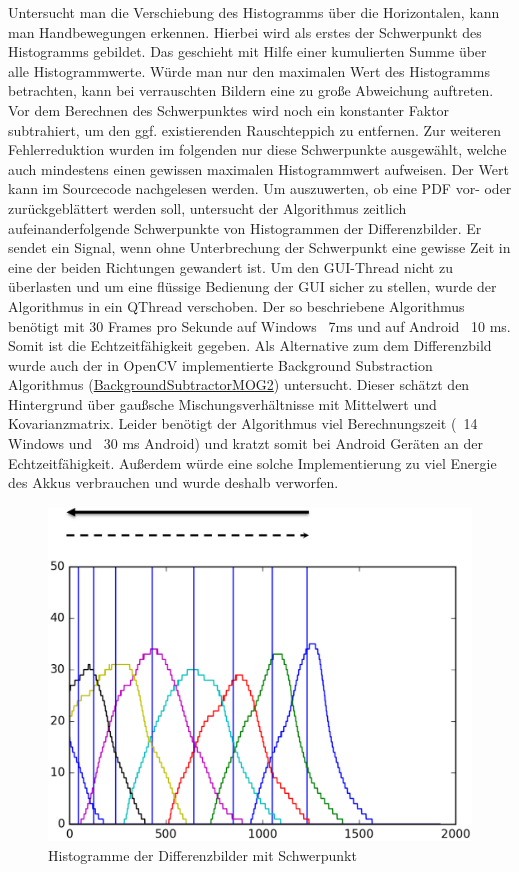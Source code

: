 Untersucht man die Verschiebung des Histogramms über die Horizontalen, kann man Handbewegungen erkennen. Hierbei wird als erstes der Schwerpunkt des Histogramms gebildet. Das geschieht mit Hilfe einer kumulierten Summe über alle Histogrammwerte. Würde man nur den maximalen Wert des Histogramms betrachten, kann bei verrauschten Bildern eine zu große Abweichung auftreten. Vor dem Berechnen des Schwerpunktes wird noch ein konstanter Faktor subtrahiert, um den ggf. existierenden Rauschteppich zu entfernen. Zur weiteren Fehlerreduktion wurden im folgenden nur diese Schwerpunkte ausgewählt, welche auch mindestens einen gewissen maximalen Histogrammwert aufweisen. Der Wert kann im Sourcecode nachgelesen werden. Um auszuwerten, ob eine PDF vor- oder zurückgeblättert werden soll, untersucht der Algorithmus zeitlich aufeinanderfolgende Schwerpunkte von Histogrammen der Differenzbilder. Er sendet ein Signal, wenn ohne Unterbrechung der Schwerpunkt eine gewisse Zeit in eine der beiden Richtungen gewandert ist. Um den GUI-Thread nicht zu überlasten und um eine flüssige Bedienung der GUI sicher zu stellen, wurde der Algorithmus in ein QThread verschoben. Der so beschriebene Algorithmus benötigt mit 30 Frames pro Sekunde auf Windows ~7ms und auf Android ~10 ms. Somit ist die Echtzeitfähigkeit gegeben. Als Alternative zum dem Differenzbild wurde auch der in OpenCV implementierte Background Substraction Algorithmus (\href{http://docs.opencv.org/3.0-rc1/d7/d7b/classcv_1_1BackgroundSubtractorMOG2.html}{BackgroundSubtractorMOG2}) untersucht. Dieser schätzt den Hintergrund über gaußsche Mischungsverhältnisse mit Mittelwert und Kovarianzmatrix. Leider benötigt der Algorithmus viel Berechnungszeit (~14 Windows und ~30 ms Android) und kratzt somit bei Android Geräten an der Echtzeitfähigkeit. Außerdem würde eine solche Implementierung zu viel Energie des Akkus verbrauchen und wurde deshalb verworfen.

\begin{figure}[ht!]
\centering
\includegraphics[angle=0,width=14cm]{handcontrol/Bilder/histogramm_schwerpunkt.png}
\caption{Histogramme der Differenzbilder mit Schwerpunkt}
\end{figure}

